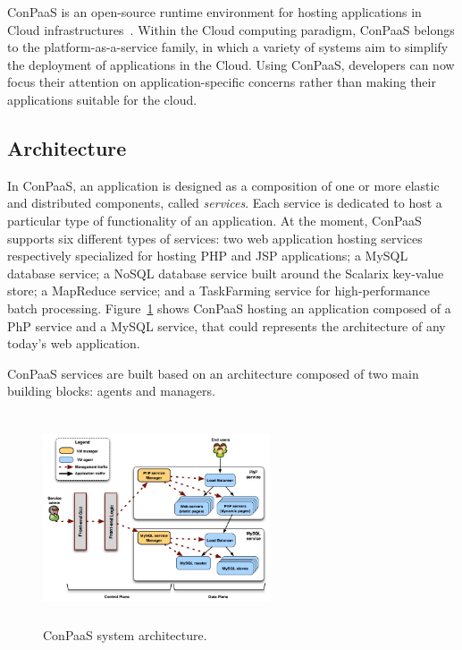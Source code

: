 

ConPaaS is an open-source runtime environment for hosting applications in Cloud infrastructures~\cite{conpaasIC}.
Within the Cloud computing paradigm, ConPaaS belongs to the platform-as-a-service family, 
in which a variety of systems aim to simplify the deployment of applications in the Cloud. Using ConPaaS,  developers can now focus their attention on application-specific concerns rather than making their applications suitable for the cloud. 

\subsection{Architecture}

In ConPaaS, an application is designed as a composition of one or more elastic and distributed components, called \emph{services}. Each service is dedicated to host a particular type of functionality of an application. At the moment, ConPaaS supports six different types of services: two web application hosting services respectively specialized for hosting PHP and JSP applications; a MySQL database service; a NoSQL database service built around the Scalarix key-value store; a MapReduce service; and a TaskFarming service for high-performance batch processing.  Figure~\ref{arch} shows ConPaaS hosting an application composed of a PhP service and a MySQL service, that could represents the architecture of any today's web application.

ConPaaS services are built based on an architecture composed of two main building blocks: agents and managers.

\begin{figure}[Ht]
\begin{center}
\includegraphics[width=0.6\textwidth, height=6.2cm]{./images/conpaasSystemArch}
\end{center}
\caption{ConPaaS system architecture.}
\label{arch}
\end{figure}


